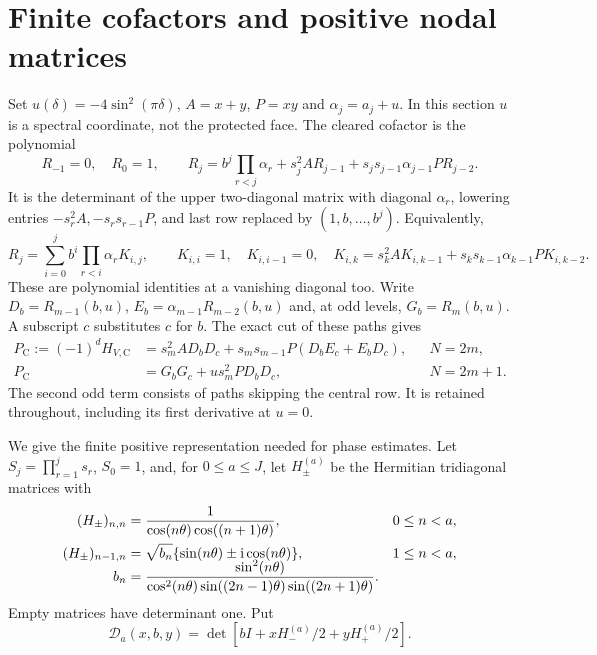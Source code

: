 \documentclass[11pt]{article}
\numberwithin{equation}{section}
\theoremstyle{definition}\newtheorem{definition}[theorem]{Definition}
\theoremstyle{remark}\newtheorem{remark}[theorem]{Remark}
\newcommand{\ii}{\mathrm i}
\begin{document}
\section{Finite cofactors and positive nodal matrices}\label{sa:finite}
Set $u(\delta)=-4\sin^2(\pi\delta)$, $A=x+y$, $P=xy$ and
$\alpha_j=a_j+u$. In this section $u$ is a spectral coordinate, not
the protected face. The cleared cofactor is the polynomial
\begin{equation}\label{sa:R}
 R_{-1}=0,\quad R_0=1,\qquad
 R_j=b^j\prod_{r<j}\alpha_r+s_j^2A R_{j-1}
                         +s_js_{j-1}\alpha_{j-1}P R_{j-2}.
\end{equation}
It is the determinant of the upper two-diagonal matrix with diagonal
$\alpha_r$, lowering entries $-s_r^2A,-s_rs_{r-1}P$, and last row
replaced by $(1,b,\ldots,b^j)$. Equivalently,
\begin{equation}\label{sa:path}
 R_j=\sum_{i=0}^j b^i\prod_{r<i}\alpha_r K_{i,j},\qquad
 K_{i,i}=1,\quad K_{i,i-1}=0,\quad
 K_{i,k}=s_k^2A K_{i,k-1}+s_ks_{k-1}\alpha_{k-1}P K_{i,k-2}.
\end{equation}
These are polynomial identities at a vanishing diagonal too.
Write $D_b=R_{m-1}(b,u)$, $E_b=\alpha_{m-1}R_{m-2}(b,u)$ and,
at odd levels, $G_b=R_m(b,u)$. A subscript $c$ substitutes $c$ for $b$.
The exact cut of these paths gives \cite[Lemma 2.1]{Local}
\begin{align}
 P_{\mathrm C}:=(-1)^dH_{V,\mathrm C}
   &=s_m^2 A D_bD_c+s_ms_{m-1}P(D_bE_c+E_bD_c),&&N=2m,
                                                    \label{sa:even}\\
 P_{\mathrm C}&=G_bG_c+u s_m^2P D_bD_c,&&N=2m+1.\label{sa:odd}
\end{align}
The second odd term consists of paths skipping the central row.
It is retained throughout, including its first derivative at $u=0$.

We give the finite positive representation needed for phase estimates.
Let $S_j=\prod_{r=1}^j s_r$, $S_0=1$, and, for $0\le a\le J$,
let $H_\pm^{(a)}$ be the Hermitian tridiagonal matrices with
\begin{align}
 (H_\pm)_{n,n}&=\frac1{\cos(n\theta)\cos((n+1)\theta)},
                              &&0\le n<a,\notag\\
 (H_\pm)_{n-1,n}&=\sqrt{b_n}\{\sin(n\theta)\pm\ii\cos(n\theta)\},
                              &&1\le n<a,\label{sa:H}\\[-6pt]
 b_n&=\frac{\sin^2(n\theta)}{\cos^2(n\theta)
                  \sin((2n-1)\theta)\sin((2n+1)\theta)}.\notag
\end{align}
Empty matrices have determinant one. Put
\begin{equation}\label{sa:D}
 \mathcal D_a(x,b,y)=\det[bI+xH_-^{(a)}/2+yH_+^{(a)}/2].
\end{equation}
\end{document}
